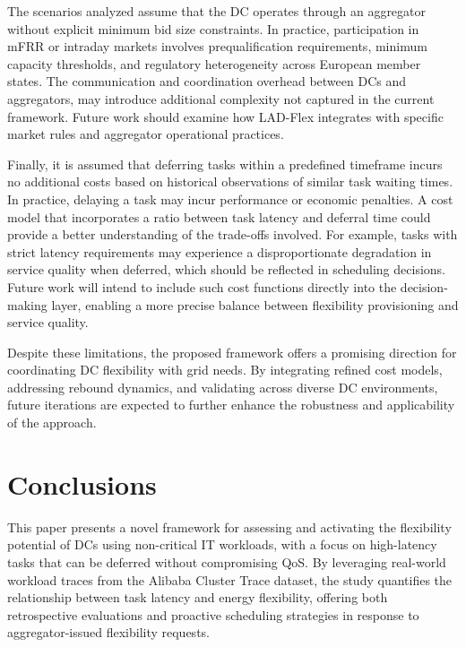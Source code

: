 \documentclass[preprint,12pt]{elsarticle}
\begin{document}
The scenarios analyzed assume that the DC operates through an aggregator without explicit minimum bid size constraints. In practice, participation in mFRR or intraday markets involves prequalification requirements, minimum capacity thresholds, and regulatory heterogeneity across European member states. The communication and coordination overhead between DCs and aggregators, may introduce additional complexity not captured in the current framework. Future work should examine how LAD-Flex integrates with specific market rules and aggregator operational practices.


Finally, it is assumed that deferring tasks within a predefined timeframe incurs no additional costs based on historical observations of similar task waiting times. In practice, delaying a task may incur performance or economic penalties. A cost model that incorporates a ratio between task latency and deferral time could provide a better understanding of the trade-offs involved. For example, tasks with strict latency requirements may experience a disproportionate degradation in service quality when deferred, which should be reflected in scheduling decisions. Future work will intend to include such cost functions directly into the decision-making layer, enabling a more precise balance between flexibility provisioning and service quality.

Despite these limitations, the proposed framework offers a promising direction for coordinating DC flexibility with grid needs. By integrating refined cost models, addressing rebound dynamics, and validating across diverse DC environments, future iterations are expected to further enhance the robustness and applicability of the approach.

%

%
%

%
%
%
%
%
%


%
%
%


\section{Conclusions}\label{conclusion}

This paper presents a novel framework for assessing and activating the flexibility potential of DCs using non-critical IT workloads, with a focus on high-latency tasks that can be deferred without compromising QoS. By leveraging real-world workload traces from the Alibaba Cluster Trace dataset, the study quantifies the relationship between task latency and energy flexibility, offering both retrospective evaluations and proactive scheduling strategies in response to aggregator-issued flexibility requests.
\end{document}
